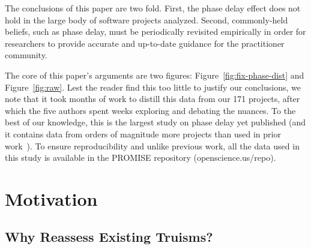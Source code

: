 \documentclass{sig-alternate}
\newcommand{\be}{\begin{enumerate}}
\newcommand{\ee}{\end{enumerate}}
\newcommand{\fig}[1]{Figure~\ref{fig:#1}}
\begin{document}

The conclusions of this paper are two fold. First, the phase delay effect does not hold in the large body of software projects analyzed. Second, commonly-held beliefs, such as phase delay, must be periodically revisited empirically in order for researchers to provide accurate and up-to-date guidance for the practitioner community.


The core of this paper's arguments are two figures: Figure~\ref{fig:fix-phase-dist} and  \fig{raw}.
Lest the reader find this too little  to justify our conclusions, we note that it took months
of work to distill this data from our 171 projects, after which the five authors spent weeks
exploring and debating the nuances. To the best of our knowledge, this is the largest study on phase delay yet published (and it contains data from orders of magnitude
more projects than used in prior work~\cite{Fagan76,Boehm76,Daly77,Stephenson76,Shull02,Royce98,Clutterbuck09,Elssamadisy02}).
To ensure reproducibility and unlike previous work,
all the data  used in this study is available in the PROMISE
repository (openscience.us/repo).

\section{Motivation}
\subsection{Why Reassess Existing Truisms?}
\end{document}
